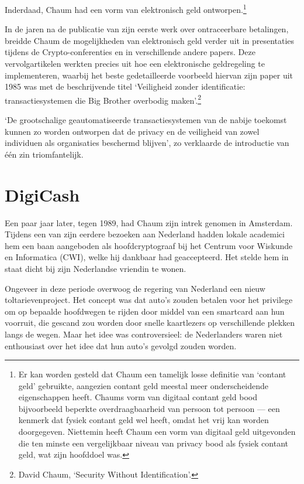 \documentclass[smalldemyvopaper,11pt,twoside,onecolumn,openright,extrafontsizes,hidelinks]{memoir}
\begin{document}
Inderdaad, Chaum had een vorm van elektronisch geld
ontworpen.\footnote{Er kan worden gesteld dat Chaum een tamelijk losse
  definitie van `contant geld' gebruikte, aangezien contant geld meestal
  meer onderscheidende eigenschappen heeft. Chaums vorm van digitaal
  contant geld bood bijvoorbeeld beperkte overdraagbaarheid van persoon
  tot persoon --- een kenmerk dat fysiek contant geld wel heeft, omdat
  het vrij kan worden doorgegeven. Niettemin heeft Chaum een vorm van
  digitaal geld uitgevonden die ten minste een vergelijkbaar niveau van
  privacy bood als fysiek contant geld, wat zijn hoofddoel was.}

In de jaren na de publicatie van zijn eerste werk over ontraceerbare
betalingen, breidde Chaum de mogelijkheden van elektronisch geld verder
uit in presentaties tijdens de Crypto-conferenties en in verschillende
andere papers. Deze vervolgartikelen werkten precies uit hoe een
elektronische geldregeling te implementeren, waarbij het beste
gedetailleerde voorbeeld hiervan zijn paper uit 1985 was met de
beschrijvende titel `Veiligheid zonder identificatie: transactiesystemen
die Big Brother overbodig maken'.\footnote{David Chaum, `Security
  Without Identification'.}

`De grootschalige geautomatiseerde transactiesystemen van de nabije
toekomst kunnen zo worden ontworpen dat de privacy en de veiligheid van
zowel individuen als organisaties beschermd blijven', zo verklaarde de
introductie van één zin triomfantelijk.

\section{DigiCash}\label{digicash}

Een paar jaar later, tegen 1989, had Chaum zijn intrek genomen in
Amsterdam. Tijdens een van zijn eerdere bezoeken aan Nederland hadden
lokale academici hem een baan aangeboden als hoofdcryptograaf bij het
Centrum voor Wiskunde en Informatica (CWI), welke hij dankbaar had
geaccepteerd. Het stelde hem in staat dicht bij zijn Nederlandse
vriendin te wonen.

Ongeveer in deze periode overwoog de regering van Nederland een nieuw
toltarievenproject. Het concept was dat auto's zouden betalen voor het
privilege om op bepaalde hoofdwegen te rijden door middel van een
smartcard aan hun voorruit, die gescand zou worden door snelle
kaartlezers op verschillende plekken langs de wegen. Maar het idee was
controversieel: de Nederlanders waren niet enthousiast over het idee dat
hun auto's gevolgd zouden worden.
\end{document}
